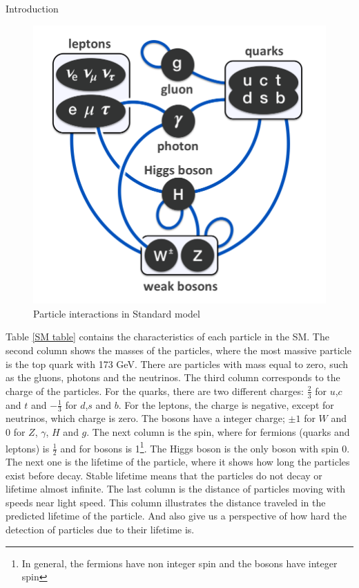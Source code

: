 \begin{chapter}{Introduction}
	\begin{figure}[ht]
		\centering
		\includegraphics[scale=0.35]{Chapter1/sm.png}
		\caption[Particle interactions in Standard model]{Particle interactions in Standard model\cite{smi}}
		\label{sm}
	\end{figure}

Table \ref{SM table} contains the characteristics of each particle in the SM. The second column shows the masses of the particles, where the most massive particle is the top quark with 173 GeV. There are particles with mass equal to zero, such as the gluons, photons and the neutrinos. 
The third column corresponds to the charge of the particles. For the quarks, there are two different charges: $\frac{2}{3}$ for $u$,$c$ and $t$ and $-\frac{1}{3}$ for $d$,$s$ and $b$. For the leptons, the charge is negative, except for neutrinos, which charge is zero. 
The bosons have a integer charge; $\pm 1$ for $W$ and 0 for $Z$, $\gamma$, $H$ and $g$.	
The next column is the spin, where for fermions (quarks and leptons) is $\frac{1}{2}$ and for bosons is 1\footnote{In general, the fermions have non integer spin and the bosons have integer spin}. The Higgs boson is the only boson with spin 0.
The next one is the lifetime of the particle, where it shows how long the particles exist before decay. Stable lifetime means that the particles do not decay or lifetime almost infinite.
The last column is the distance of particles moving with speeds near light speed. This column illustrates the distance traveled in the predicted lifetime of the particle. And also give us a perspective of how hard the detection of  particles due to their lifetime is.  


\end{chapter}
